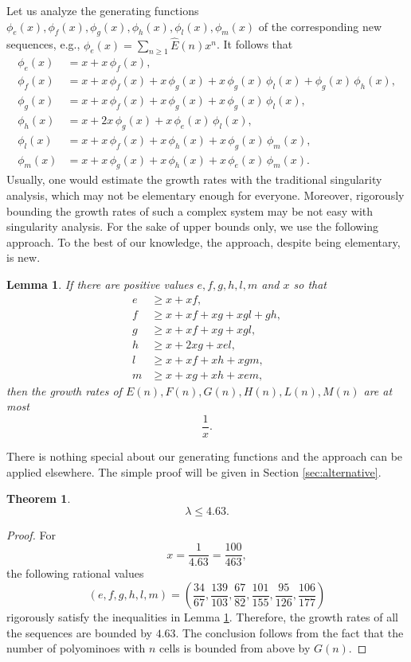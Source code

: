 \documentclass[a4paper,12pt]{article}
\newtheorem{theorem}{Theorem}
\newtheorem{lemma}{Lemma}
\begin{document}
Let us analyze the generating functions $\phi_e(x),\phi_f(x),\phi_g(x),\phi_h(x),\phi_l(x),\phi_m(x)$ of the corresponding new sequences, e.g., $\phi_e(x)=\sum_{n\ge 1} \hat{E}(n) x^n$. It follows that
\begin{align*}
\phi_e(x) &= x + x\,\phi_f(x), \\
\phi_f(x) &= x + x\,\phi_f(x) + x\,\phi_g(x) + x\,\phi_g(x)\,\phi_l(x) + \phi_g(x)\,\phi_h(x), \\
\phi_g(x) &= x + x\,\phi_f(x) + x\,\phi_g(x) + x\,\phi_g(x)\,\phi_l(x), \\
\phi_h(x) &= x + 2x\,\phi_g(x) + x\,\phi_e(x)\,\phi_l(x), \\
\phi_l(x) &= x + x\,\phi_f(x) + x\,\phi_h(x) + x\,\phi_g(x)\,\phi_m(x), \\
\phi_m(x) &= x + x\,\phi_g(x) + x\,\phi_h(x) + x\,\phi_e(x)\,\phi_m(x).
\end{align*}
Usually, one would estimate the growth rates with the traditional singularity analysis, which may not be elementary enough for everyone. Moreover, rigorously bounding the growth rates of such a complex system may be not easy with singularity analysis. For the sake of upper bounds only, we use the following approach. To the best of our knowledge, the approach, despite being elementary, is new.
\begin{lemma}\label{lem:alternative}
If there are positive values $e,f,g,h,l,m$ and $x$ so that
\begin{align*}
e &\ge x + x f, \\
f &\ge x + x f + x g + x g l + g h, \\
g &\ge x + x f + x g + x g l, \\
h &\ge x + 2x g + x e l, \\
l &\ge x + x f + x h + x g m, \\
m &\ge x + x g + x h + x e m,
\end{align*}
then the growth rates of $E(n),F(n),G(n),H(n),L(n),M(n)$ are at most 
\[
    \frac{1}{x}.
\]
\end{lemma}
There is nothing special about our generating functions and the approach can be applied elsewhere.
The simple proof will be given in Section \ref{sec:alternative}.
\begin{theorem} \label{thm:4.63}
    \[
        \lambda\le 4.63.
    \]
\end{theorem}
\begin{proof}
For
\[
    x = \frac{1}{4.63} = \frac{100}{463},
\]
the following rational values
\[
(e,f,g,h,l,m) = 
\left(
\frac{34}{67},
\frac{139}{103},
\frac{67}{82},
\frac{101}{155},
\frac{95}{126},
\frac{106}{177}
\right)
\]
rigorously satisfy the inequalities in Lemma \ref{lem:alternative}. Therefore, the growth rates of all the sequences are bounded by $4.63$. The conclusion follows from the fact that the number of polyominoes with $n$ cells is bounded from above by $G(n)$.
\end{proof}
\end{document}

